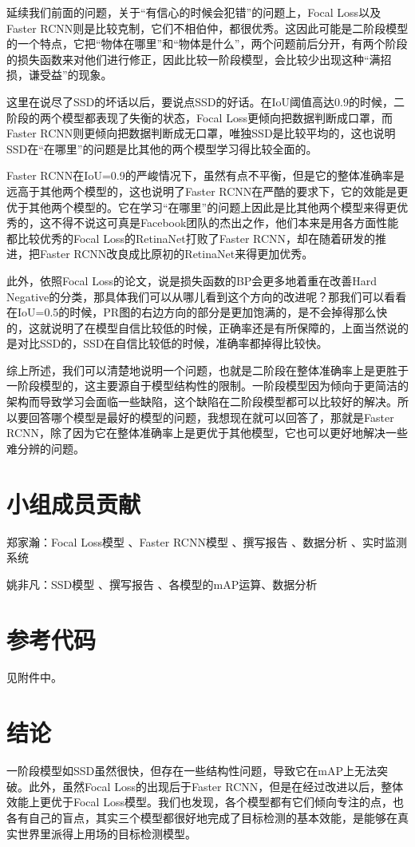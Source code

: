 \documentclass[journal,transmag]{IEEEtran}
\begin{document}
延续我们前面的问题，关于“有信心的时候会犯错”的问题上，Focal Loss以及Faster RCNN则是比较克制，它们不相伯仲，都很优秀。这因此可能是二阶段模型的一个特点，它把“物体在哪里”和“物体是什么”，两个问题前后分开，有两个阶段的损失函数来对他们进行修正，因此比较一阶段模型，会比较少出现这种“满招损，谦受益”的现象。

这里在说尽了SSD的坏话以后，要说点SSD的好话。在IoU阈值高达0.9的时候，二阶段的两个模型都表现了失衡的状态，Focal Loss更倾向把数据判断成口罩，而Faster RCNN则更倾向把数据判断成无口罩，唯独SSD是比较平均的，这也说明SSD在“在哪里”的问题是比其他的两个模型学习得比较全面的。

Faster RCNN在IoU=0.9的严峻情况下，虽然有点不平衡，但是它的整体准确率是远高于其他两个模型的，这也说明了Faster RCNN在严酷的要求下，它的效能是更优于其他两个模型的。它在学习“在哪里”的问题上因此是比其他两个模型来得更优秀的，这不得不说这可真是Facebook团队的杰出之作，他们本来是用各方面性能都比较优秀的Focal Loss的RetinaNet打败了Faster RCNN，却在随着研发的推进，把Faster RCNN改良成比原初的RetinaNet来得更加优秀。

此外，依照Focal Loss的论文，说是损失函数的BP会更多地着重在改善Hard Negative的分类，那具体我们可以从哪儿看到这个方向的改进呢？那我们可以看看在IoU=0.5的时候，PR图的右边方向的部分是更加饱满的，是不会掉得那么快的，这就说明了在模型自信比较低的时候，正确率还是有所保障的，上面当然说的是对比SSD的，SSD在自信比较低的时候，准确率都掉得比较快。

综上所述，我们可以清楚地说明一个问题，也就是二阶段在整体准确率上是更胜于一阶段模型的，这主要源自于模型结构性的限制。一阶段模型因为倾向于更简洁的架构而导致学习会面临一些缺陷，这个缺陷在二阶段模型都可以比较好的解决。所以要回答哪个模型是最好的模型的问题，我想现在就可以回答了，那就是Faster RCNN，除了因为它在整体准确率上是更优于其他模型，它也可以更好地解决一些难分辨的问题。

\section{小组成员贡献}
郑家瀚：Focal Loss模型 、Faster RCNN模型 、撰写报告 、数据分析 、实时监测系统

姚非凡：SSD模型 、撰写报告 、各模型的mAP运算、数据分析
\section{参考代码}
见附件中。
\section{结论}
一阶段模型如SSD虽然很快，但存在一些结构性问题，导致它在mAP上无法突破。此外，虽然Focal Loss的出现后于Faster RCNN，但是在经过改进以后，整体效能上更优于Focal Loss模型。我们也发现，各个模型都有它们倾向专注的点，也各有自己的盲点，其实三个模型都很好地完成了目标检测的基本效能，是能够在真实世界里派得上用场的目标检测模型。
\end{document}
